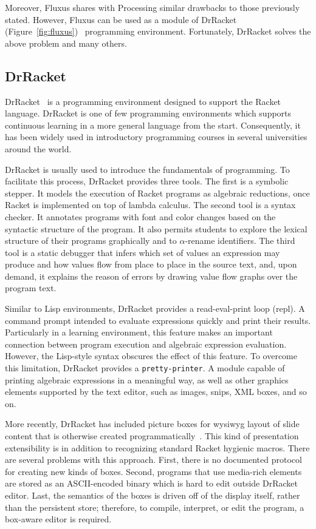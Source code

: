 Moreover, Fluxus shares with Processing similar drawbacks to those previously stated. However, Fluxus can be used as a module of DrRacket (Figure~\ref{fig:fluxus})~\citep{findler2002drscheme} programming environment. Fortunately, DrRacket solves the above problem and many others.
\subsection{DrRacket}
\label{subsec:drracket}
DrRacket~\citep{findler2002drscheme} is a programming environment designed to support the Racket language. DrRacket is one of few programming environments which supports continuous learning in a more general language from the start. Consequently, it has been widely used in introductory programming courses in several universities around the world.

DrRacket is usually used to introduce the fundamentals of programming. To facilitate this process, DrRacket provides three tools. The first is a symbolic stepper. It models the execution of Racket programs as algebraic reductions, once Racket is implemented on top of lambda calculus. The second tool is a syntax checker. It annotates programs with font and color changes based on the syntactic structure of the program. It also permits students to explore the lexical structure of their programs graphically and to $\alpha$-rename identifiers. The third tool is a static debugger that infers which set of values an expression may produce and how values flow from place to place in the source text, and, upon demand, it explains the reason of errors by drawing value flow graphs over the program text.

Similar to Lisp environments, DrRacket provides a read-eval-print loop (\gls{repl}). A command prompt intended to evaluate expressions quickly and print their results. Particularly in a learning environment, this feature makes an important connection between program execution and algebraic expression evaluation. However, the Lisp-style syntax obscures the effect of this feature. To overcome this limitation, DrRacket provides a \texttt{pretty-printer}. A module capable of printing algebraic expressions in a meaningful way, as well as other graphics elements supported by the text editor, such as images, snips, XML boxes, and so on.

More recently, DrRacket has included picture boxes for \gls{wysiwyg} layout of slide content that is otherwise created programmatically~\citep{findler2004slideshow}. This kind of presentation extensibility is in addition to recognizing standard Racket hygienic macros. There are several problems with this approach. First, there is no documented protocol for creating new kinds of boxes. Second, programs that use media-rich elements are stored as an ASCII-encoded binary which is hard to edit outside DrRacket editor. Last, the semantics of the boxes is driven off of the display itself, rather than the persistent store; therefore, to compile, interpret, or edit the program, a box-aware editor is required.

